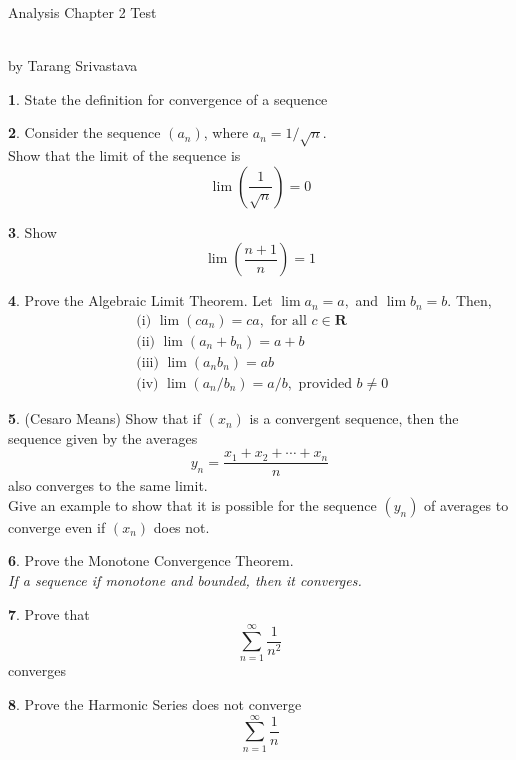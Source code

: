 \documentclass[10pt, twocolumn]{article}
\author{Tarang Srivastava}
\newcommand{\makechaptertitle}[1]{
\begin{center}
	\begin{large}
		#1
	\end{large}
	\begin{small}
		\\by Tarang Srivastava
	\end{small}
\end{center}
}
\theoremstyle{definition}
\newtheorem{q}{}
\begin{document}
		\makechaptertitle{Analysis Chapter 2 Test}
		\begin{q}
			State the definition for convergence of a sequence
		\end{q}
		\begin{q}
			Consider the sequence $ \left(a_n\right) $, where $ a_n = 1/\sqrt{n} $. \\
			Show that the limit of the sequence is
			\[ \lim \left(\dfrac{1}{\sqrt{n}}\right) = 0\]
		\end{q}
		\begin{q}
			Show
			\[ \lim \left( \frac { n + 1 } { n } \right) = 1 \]
		\end{q}
		\begin{q}
			Prove the Algebraic Limit Theorem. Let $ \lim a_n = a, $ and $ \lim b_n = b $. Then,
			\[ \begin{array} { l } { \text { (i) } \lim \left( c a _ { n } \right) = c a , \text { for all } c \in \mathbf { R } } \\ { \text { (ii) } \lim \left( a _ { n } + b _ { n } \right) = a + b } \\ { \text { (iii) } \lim \left( a _ { n } b _ { n } \right) = a b } \\ { \text { (iv) } \lim \left( a _ { n } / b _ { n } \right) = a / b , \text { provided } b \neq 0 } \end{array} \]
		\end{q}
		\begin{q}
			(Cesaro Means) Show that if $ (x_n) $ is a convergent sequence, then the sequence given by the averages
			\[ y _ { n } = \frac { x _ { 1 } + x _ { 2 } + \cdots + x _ { n } } { n } \]
			also converges to the same limit. \\
			Give an example to show that it is possible for the sequence $ (y_n) $ of averages
			to converge even if $ (x_n) $ does not.
		\end{q}
		\begin{q}
			Prove the Monotone Convergence Theorem.\\
			\textit{If a sequence if monotone and bounded, then it converges.}
		\end{q}
		\begin{q}
			Prove that 
			\[ \sum _ { n = 1 } ^ { \infty } \frac { 1 } { n ^ { 2 } } \]
			converges
		\end{q}
		\begin{q}
			Prove the Harmonic Series does not converge
			\[ \sum _ { n = 1 } ^ { \infty } \frac { 1 } { n } \]
		\end{q}
\end{document}
